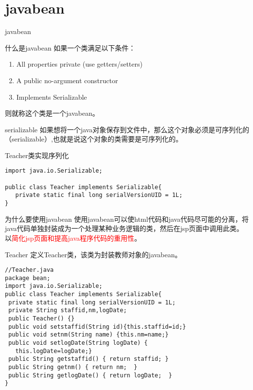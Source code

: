 \documentclass{beamer}
\begin{document}
\section{javabean}
\begin{frame}
\Huge{\centerline{javabean}}
\end{frame}
\begin{frame}{什么是javabean}
如果一个类满足以下条件：
\begin{enumerate}
\item
All properties private (use getters/setters)
\item
A public no-argument constructor
\item
Implements Serializable
\end{enumerate}
则就称这个类是一个javabean。
\end{frame}
\begin{frame}[fragile]{serializable}
如果想将一个java对象保存到文件中，那么这个对象必须是可序列化的（serializable）,也就是说这个对象的类需要是可序列化的。
\begin{block}{Teacher类实现序列化}
\begin{lstlisting}
import java.io.Serializable;

public class Teacher implements Serializable{
   private static final long serialVersionUID = 1L;
}
\end{lstlisting}
\end{block}
\end{frame}
\begin{frame}{为什么要使用javabean}
使用javabean可以使html代码和java代码尽可能的分离，将java代码单独封装成为一个处理某种业务逻辑的类，然后在jsp页面中调用此类。以\textcolor{red}{简化jsp页面和提高java程序代码的重用性}。
\end{frame}
\begin{frame}[fragile]{Teacher}
定义Teacher类，该类为封装教师对象的javabean。
\begin{lstlisting}
//Teacher.java
package bean;
import java.io.Serializable;
public class Teacher implements Serializable{
 private static final long serialVersionUID = 1L;
 private String staffid,nm,logDate;	
 public Teacher() {}
 public void setstaffid(String id){this.staffid=id;}
 public void setnm(String name) {this.nm=name;}
 public void setlogDate(String logDate) {
   this.logDate=logDate;}
 public String getstaffid() { return staffid; }
 public String getnm() { return nm;  }
 public String getlogDate() { return logDate;  }
}
\end{lstlisting}

\end{frame}
\end{document}
